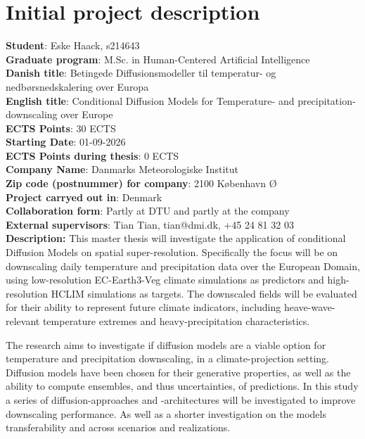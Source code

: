 \section*{Initial project description}

\textbf{Student}: Eske Haack, s214643 \\
\textbf{Graduate program}: M.Sc. in Human-Centered Artificial Intelligence \\
\textbf{Danish title}: Betingede Diffusionsmodeller til temperatur- og nedbørsnedskalering over Europa \\
\textbf{English title}: Conditional Diffusion Models for Temperature- and precipitation-downscaling over Europe \\
\textbf{ECTS Points}: 30 ECTS \\
\textbf{Starting Date}: 01-09-2026 \\
\textbf{ECTS Points during thesis}: 0 ECTS \\
\textbf{Company Name}: Danmarks Meteorologiske Institut \\
\textbf{Zip code (postnummer) for company}: 2100 København Ø \\
\textbf{Project carryed out in}: Denmark \\
\textbf{Collaboration form}: Partly at DTU and partly at the company \\
\textbf{External supervisors}: Tian Tian, tian@dmi.dk, +45 24 81 32 03 \\
\textbf{Description: } This master thesis will investigate the application of conditional Diffusion Models on spatial super-resolution. Specifically the focus will be on downscaling daily temperature and precipitation data over the European Domain, using low-resolution EC-Earth3-Veg climate simulations as predictors and high-resolution HCLIM simulations as targets. The downscaled fields will be evaluated for their ability to represent future climate indicators, including heave-wave-relevant temperature extremes and heavy-precipitation characteristics.

The research aims to investigate if diffusion models are a viable option for temperature and precipitation downscaling, in a climate-projection setting. Diffusion models have been chosen for their generative properties, as well as the ability to compute ensembles, and thus uncertainties, of predictions.
In this study a series of diffusion-approaches and -architectures will be investigated to improve downscaling performance. As well as a shorter investigation on the models transferability and across scenarios and realizations. 